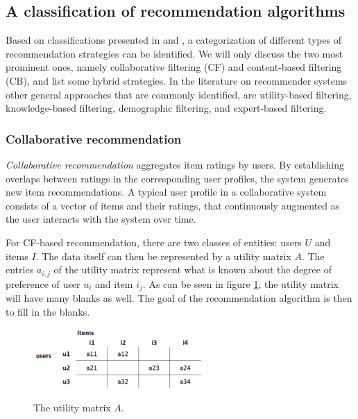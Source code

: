 \subsection{A classification of recommendation algorithms}\label{chapter:literature_study:section:computer:subsection:algorithms}

Based on classifications presented in \cite{burke:2002} and \cite{celma:2008:phd}, a categorization of different types of recommendation strategies can be identified. We will only discuss the two most prominent ones, namely collaborative filtering (CF) and content-based filtering (CB)\cite{herlocker:2000, rajaraman:2012}, and list some hybrid strategies. In the literature on recommender systems other general approaches that are commonly identified, are utility-based filtering, knowledge-based filtering, demographic filtering, and expert-based filtering\cite{burke:2002, bostandjiev:2012}.


\subsubsection{Collaborative recommendation}\label{chapter:literature_study:section:computer:subsection:algorithms:subsubsection:cf}

\emph{Collaborative recommendation} aggregates item ratings by users. By establishing overlaps between ratings in the corresponding user profiles, the system generates new item recommendations\cite{burke:2002, herlocker:2000}. A typical user profile in a collaborative system consists of a vector of items and their ratings, that continuously augmented as the user interacts with the system over time\cite{burke:2002}. 

For CF-based recommendation, there are two classes of entities: users $U$ and items $I$. The data itself can then be represented by a utility matrix $A$. The entries $a_{i,j}$ of the utility matrix represent what is known about the degree of preference of user $u_{i}$ and item $i_{j}$\cite{rajaraman:2012}. As can be seen in figure \ref{figure:utilitymatrix}, the utility matrix will have many blanks as well. The goal of the recommendation algorithm is then to fill in the blanks\cite{rajaraman:2012}.

\begin{figure}%
\begin{center}
	\includegraphics[width=250px]{img/utility_matrix}%
\end{center}
	\caption{The utility matrix $A$.}%
	\label{figure:utilitymatrix}%
\end{figure}

